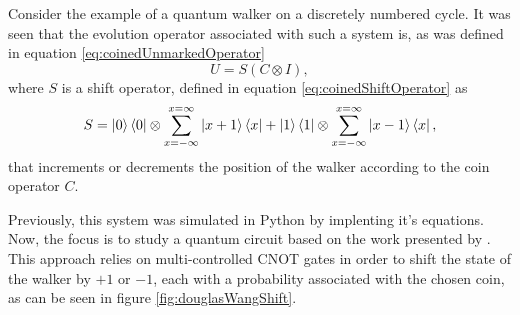 \documentclass[../../dissertation.tex]{subfiles}
\begin{document}
Consider the example of a quantum walker on a discretely numbered cycle. It was seen that the evolution operator associated with such a system is, as was defined in equation \ref{eq:coinedUnmarkedOperator}
\begin{equation}
	   U = S(C\otimes I), 
           \label{eq:coinedUnmarkedOperatorQiskit}
\end{equation}
where $S$ is a shift operator, defined in equation \ref{eq:coinedShiftOperator} as 
\begin{equation}
          S = \ket{0}\bra{0} \otimes \sum_{x=-\infty}^{x=\infty} \ket{x+1}\bra{x} + \ket{1}\bra{1}\otimes \sum_{x=-\infty}^{x=\infty} \ket{x-1}\bra{x},
	  \label{eq:shiftMatrixQiskit}
\end{equation} 
that increments or decrements the position of the walker according to the coin operator $C$.\par
Previously, this system was simulated in Python by implenting it's equations. Now, the focus is to study a quantum circuit based on the work presented by \cite{douglaswang07}. This approach relies on multi-controlled CNOT gates in order to shift the state of the walker by $+1$ or $-1$, each with a probability associated with the chosen coin, as can be seen in figure \ref{fig:douglasWangShift}. 
\end{document}
